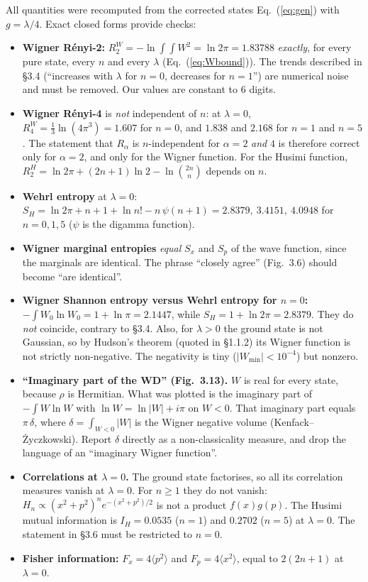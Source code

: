 \documentclass[11pt,a4paper]{article}
\newcommand{\Eq}[1]{Eq.~(#1)}
\begin{document}
All quantities were recomputed from the corrected states \Eq{\ref{eq:gen}} with $g=\lambda/4$.
Exact closed forms provide checks:
\begin{itemize}
\item \textbf{Wigner Rényi-2:} $R_2^W=-\ln\!\int\!\!\int W^2=\ln2\pi=1.83788$ \emph{exactly}, for
  every pure state, every $n$ and every $\lambda$ (\Eq{\ref{eq:Wbound}}). The trends described
  in \S3.4 (``increases with $\lambda$ for $n=0$, decreases for $n=1$'') are numerical noise
  and must be removed. Our values are constant to 6 digits.
\item \textbf{Wigner Rényi-4} is \emph{not} independent of $n$: at $\lambda=0$,
  $R_4^W=\tfrac13\ln(4\pi^3)=1.607$ for $n=0$, and $1.838$ and $2.168$ for $n=1$ and $n=5$. The
  statement that $R_\alpha$ is $n$-independent for $\alpha=2$ \emph{and} $4$ is therefore
  correct only for $\alpha=2$, and only for the Wigner function. For the Husimi function,
  $R_2^H=\ln2\pi+(2n+1)\ln2-\ln\binom{2n}{n}$ depends on $n$.
\item \textbf{Wehrl entropy} at $\lambda=0$:
  $S_H=\ln2\pi+n+1+\ln n!-n\,\psi(n+1)=2.8379,\ 3.4151,\ 4.0948$ for $n=0,1,5$
  ($\psi$ is the digamma function).
\item \textbf{Wigner marginal entropies} \emph{equal} $S_x$ and $S_p$ of the wave function,
  since the marginals are identical. The phrase ``closely agree'' (Fig.~3.6) should become
  ``are identical''.
\item \textbf{Wigner Shannon entropy versus Wehrl entropy for $n=0$:}
  $-\int W_0\ln W_0=1+\ln\pi=2.1447$, while $S_H=1+\ln2\pi=2.8379$. They do \emph{not}
  coincide, contrary to \S3.4. Also, for $\lambda>0$ the ground state is not Gaussian, so by
  Hudson's theorem (quoted in \S1.1.2) its Wigner function is not strictly non-negative. The
  negativity is tiny ($|W_{\min}|<10^{-4}$) but nonzero.
\item \textbf{``Imaginary part of the WD'' (Fig.~3.13).} $W$ is real for every state, because
  $\rho$ is Hermitian. What was plotted is the imaginary part of $-\int W\ln W$ with
  $\ln W=\ln|W|+i\pi$ on $W<0$. That imaginary part equals $\pi\,\delta$, where
  $\delta=\int_{W<0}|W|$ is the Wigner negative volume (Kenfack--Życzkowski). Report
  $\delta$ directly as a non-classicality measure, and drop the language of an ``imaginary
  Wigner function''.
\item \textbf{Correlations at $\lambda=0$.} The ground state factorises, so all its
  correlation measures vanish at $\lambda=0$. For $n\ge1$ they do not vanish:
  $H_n\propto(x^2+p^2)^ne^{-(x^2+p^2)/2}$ is not a product $f(x)g(p)$. The Husimi mutual
  information is $I_H=0.0535$ ($n=1$) and $0.2702$ ($n=5$) at $\lambda=0$. The statement in
  \S3.6 must be restricted to $n=0$.
\item \textbf{Fisher information:} $F_x=4\langle p^2\rangle$ and $F_p=4\langle x^2\rangle$, equal
  to $2(2n+1)$ at $\lambda=0$.
\end{itemize}
\end{document}
